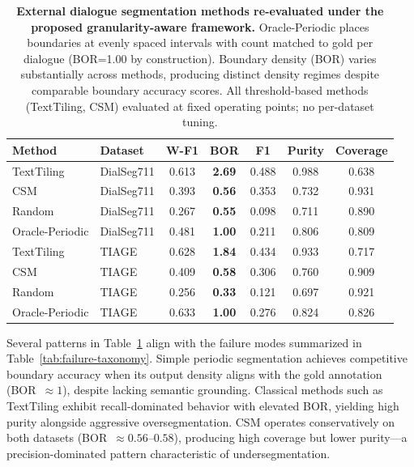 \documentclass{article}
\begin{document}
\begin{table}[t]
  \centering
  \begin{tabular}{l l c c c c c}
    \toprule Method & Dataset & W-F1 & \textbf{BOR} & F1 & Purity &
    Coverage \\ \midrule TextTiling & DialSeg711 & 0.613 &
    \textbf{2.69} & 0.488 & 0.988 & 0.638 \\ CSM & DialSeg711 & 0.393
    & \textbf{0.56} & 0.353 & 0.732 & 0.931 \\ Random & DialSeg711 &
    0.267 & \textbf{0.55} & 0.098 & 0.711 & 0.890 \\ Oracle-Periodic &
    DialSeg711 & 0.481 & \textbf{1.00} & 0.211 & 0.806 & 0.809
    \\ \midrule TextTiling & TIAGE & 0.628 & \textbf{1.84} & 0.434 &
    0.933 & 0.717 \\ CSM & TIAGE & 0.409 & \textbf{0.58} & 0.306 &
    0.760 & 0.909 \\ Random & TIAGE & 0.256 & \textbf{0.33} & 0.121 &
    0.697 & 0.921 \\ Oracle-Periodic & TIAGE & 0.633 & \textbf{1.00} &
    0.276 & 0.824 & 0.826 \\ \bottomrule
  \end{tabular}
  \caption{\textbf{External dialogue segmentation methods re-evaluated
      under the proposed granularity-aware framework.} Oracle-Periodic
    places boundaries at evenly spaced intervals with count matched to
    gold per dialogue (BOR=1.00 by construction). Boundary density (BOR)
    varies substantially across methods, producing distinct density
    regimes despite comparable boundary accuracy scores. All
    threshold-based methods (TextTiling, CSM) evaluated at fixed
    operating points; no per-dataset tuning.}
  \label{tab:external_methods}
\end{table}

Several patterns in Table~\ref{tab:external_methods} align with the
failure modes summarized in Table~\ref{tab:failure-taxonomy}. Simple
periodic segmentation achieves competitive boundary accuracy when its
output density aligns with the gold annotation (BOR~$\approx 1$),
despite lacking semantic grounding. Classical methods such as
TextTiling exhibit recall-dominated behavior with elevated BOR,
yielding high purity alongside aggressive oversegmentation. CSM
operates conservatively on both datasets (BOR~$\approx 0.56$--$0.58$),
producing high coverage but lower purity---a precision-dominated
pattern characteristic of undersegmentation.
\end{document}
